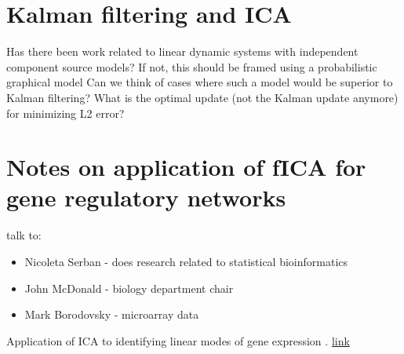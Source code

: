 \documentclass{article}
\begin{document}
  \section{Kalman filtering and ICA}
  Has there been work related to linear dynamic systems with independent component source models?
  If not, this should be framed using a probabilistic graphical model
  Can we think of cases where such a model would be superior to Kalman filtering?
  What is the optimal update (not the Kalman update anymore) for minimizing L2 error?


  \section{Notes on application of fICA for gene regulatory networks}
  
  talk to:
  
  \begin{itemize}
  \item Nicoleta Serban - does research related to statistical bioinformatics
  \item John McDonald - biology department chair
  \item Mark Borodovsky - microarray data

  \end{itemize}

Application of ICA to identifying linear modes of gene expression \cite{liebermeister2002lmg}.
\href{http://scholar.google.com/scholar?hl=en&lr=&cluster=15236205428324185707}{link}



\end{document}
